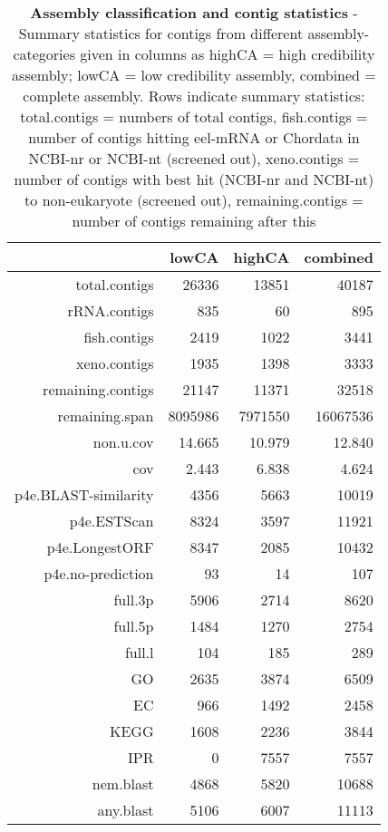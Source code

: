 \begin{table}[!h]
  \begin{center}
  \begin{tabular}{rrrr}
  \hline
 & lowCA & highCA & combined \\ 
  \hline
total.contigs & 26336 & 13851 & 40187 \\ 
  rRNA.contigs & 835 & 60 & 895 \\ 
  fish.contigs & 2419 & 1022 & 3441 \\ 
  xeno.contigs & 1935 & 1398 & 3333 \\ 
  remaining.contigs & 21147 & 11371 & 32518 \\ 
  remaining.span & 8095986 & 7971550 & 16067536 \\ 
  non.u.cov & 14.665 & 10.979 & 12.840 \\ 
  cov & 2.443 & 6.838 & 4.624 \\ 
  p4e.BLAST-similarity & 4356 & 5663 & 10019 \\ 
  p4e.ESTScan & 8324 & 3597 & 11921 \\ 
  p4e.LongestORF & 8347 & 2085 & 10432 \\ 
  p4e.no-prediction & 93 & 14 & 107 \\ 
  full.3p & 5906 & 2714 & 8620 \\ 
  full.5p & 1484 & 1270 & 2754 \\ 
  full.l & 104 & 185 & 289 \\ 
  GO & 2635 & 3874 & 6509 \\ 
  EC & 966 & 1492 & 2458 \\ 
  KEGG & 1608 & 2236 & 3844 \\ 
  IPR & 0 & 7557 & 7557 \\ 
  nem.blast & 4868 & 5820 & 10688 \\ 
  any.blast & 5106 & 6007 & 11113 \\ 
   \hline
\end{tabular}
\caption[Assembly classification and contig
statistics]{\textbf{Assembly classification and contig statistics} -
  Summary statistics for contigs from different assembly-categories
  given in columns as highCA = high credibility assembly; lowCA = low
  credibility assembly, combined = complete assembly. Rows indicate
  summary statistics: total.contigs = numbers of total contigs,
  fish.contigs = number of contigs hitting eel-mRNA or Chordata in
  NCBI-nr or NCBI-nt (screened out), xeno.contigs = number of contigs
  with best hit (NCBI-nr and NCBI-nt) to non-eukaryote (screened out),
  remaining.contigs = number of contigs remaining after this
}
\end{center}
\end{table}
